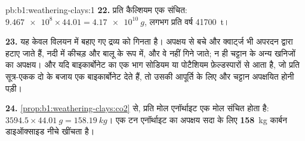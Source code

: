 \begin{solution}{pb:b1:weathering-clays:1}
\textbf{22.} प्रति कैल्शियम एक  संचित: $\num{9.467e8} \times 44.01 =
\qty{4.17e10}{g}$, लगभग प्रति वर्ष \qty{41700}{t}।

\textbf{23.} यह केवल विलयन में बहाए गए द्रव्य को गिनता है। अपक्षय से बचे  और क्वार्ट्ज भी अपरदन द्वारा हटाए जाते हैं, नदी में कीचड़ और बालू के रूप में, और वे नहीं गिने जाते; न ही चट्टान के अन्य खनिजों का अपक्षय। और यदि बाइकार्बोनेट का एक भाग सोडियम या पोटैशियम फ़ेल्डस्पारों से आता है, जो प्रति सूत्र-एकक दो के बजाय एक बाइकार्बोनेट देते हैं, तो उसकी आपूर्ति के लिए और चट्टान अपक्षयित होनी पड़ी।

\textbf{24.} \cref{prop:b1:weathering-clays:co2} से, प्रति मोल एनॉर्थाइट एक मोल  संचित होता है:
$3594.5 \times \qty{44.01}{g} = \qty{158.19}{kg}$। एक टन एनॉर्थाइट का अपक्षय सदा के लिए
\textbf{158}~kg कार्बन डाइऑक्साइड नीचे खींचता है।
\end{solution}
